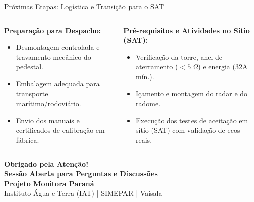 ﻿\documentclass[aspectratio=169]{beamer}
\begin{document}
\begin{frame}{Pr{\'o}ximas Etapas: Log{\'i}stica e Transi{\c{c}}{\~a}o para o SAT}
    \begin{columns}[T]
        \begin{column}{0.48\textwidth}
            \textbf{Prepara{\c{c}}{\~a}o para Despacho:}
            \begin{itemize}
                \item Desmontagem controlada e travamento mec{\^a}nico do pedestal.
                \item Embalagem adequada para transporte mar{\'i}timo/rodovi{\'a}rio.
                \item Envio dos manuais e certificados de calibra{\c{c}}{\~a}o em f{\'a}brica.
            \end{itemize}
        \end{column}
        \begin{column}{0.48\textwidth}
            \textbf{Pr{\'e}-requisitos e Atividades no S{\'i}tio (SAT):}
            \begin{itemize}
                \item Verifica{\c{c}}{\~a}o da torre, anel de aterramento ($< 5\,\Omega$) e energia (32A m{\'i}n.).
                \item I{\c{c}}amento e montagem do radar e do radome.
                \item Execu{\c{c}}{\~a}o dos testes de aceita{\c{c}}{\~a}o em s{\'i}tio (SAT) com valida{\c{c}}{\~a}o de ecos reais.
            \end{itemize}
        \end{column}
    \end{columns}
\end{frame}

\begin{frame}
    \centering
    \Huge \textbf{Obrigado pela Aten{\c{c}}{\~a}o!} \\
    \vspace{0.8cm}
    \Large \textbf{Sess{\~a}o Aberta para Perguntas e Discuss{\~o}es} \\
    \vspace{0.6cm}
    \small \textbf{Projeto Monitora Paran{\'a}} \\
    \footnotesize Instituto {\'A}gua e Terra (IAT) \quad | \quad SIMEPAR \quad | \quad Vaisala
\end{frame}
\end{document}
